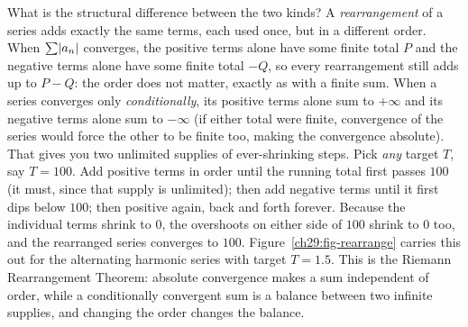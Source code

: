 \begin{happeningbox}
What is the structural difference between the two kinds? A \emph{rearrangement} of a series adds exactly the same terms, each used once, but in a different order. When $\sum\lvert a_n\rvert$ converges, the positive terms alone have some finite total $P$ and the negative terms alone have some finite total $-Q$, so every rearrangement still adds up to $P - Q$: the order does not matter, exactly as with a finite sum. When a series converges only \emph{conditionally}, its positive terms alone sum to $+\infty$ and its negative terms alone sum to $-\infty$ (if either total were finite, convergence of the series would force the other to be finite too, making the convergence absolute). That gives you two unlimited supplies of ever-shrinking steps. Pick \emph{any} target $T$, say $T = 100$. Add positive terms in order until the running total first passes $100$ (it must, since that supply is unlimited); then add negative terms until it first dips below $100$; then positive again, back and forth forever. Because the individual terms shrink to $0$, the overshoots on either side of $100$ shrink to $0$ too, and the rearranged series converges to $100$. Figure~\ref{ch29:fig-rearrange} carries this out for the alternating harmonic series with target $T = 1.5$. This is the Riemann Rearrangement Theorem: absolute convergence makes a sum independent of order, while a conditionally convergent sum is a balance between two infinite supplies, and changing the order changes the balance.
\end{happeningbox}

